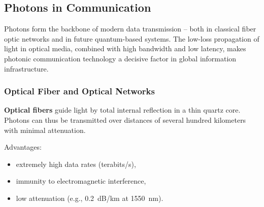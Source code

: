 \subsection{Photons in Communication}

Photons form the backbone of modern data transmission – both in classical fiber optic networks and in future quantum-based systems. The low-loss propagation of light in optical media, combined with high bandwidth and low latency, makes photonic communication technology a decisive factor in global information infrastructure.

\subsubsection{Optical Fiber and Optical Networks}

\textbf{Optical fibers} guide light by total internal reflection in a thin quartz core. Photons can thus be transmitted over distances of several hundred kilometers with minimal attenuation.

Advantages:
\begin{itemize}
	\item extremely high data rates (terabits/s),
	\item immunity to electromagnetic interference,
	\item low attenuation (e.g., \SI{0.2}{dB/km} at \SI{1550}{nm}).
\end{itemize}

